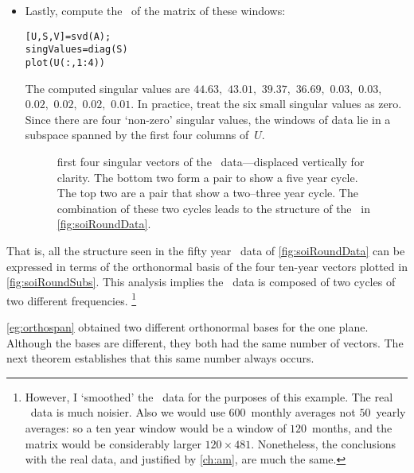 \begin{example}
\begin{itemize}
\item Lastly, compute the \svd\ of the matrix of these windows:
\begin{verbatim}
[U,S,V]=svd(A);
singValues=diag(S)
plot(U(:,1:4))
\end{verbatim}
\setbox\ajrqrbox\hbox{}%
\marginpar{\usebox{\ajrqrbox}}%
The computed singular values are $44.63,$ $43.01,$ $39.37,$ $36.69,$ $0.03,$ $0.03,$ $0.02,$ $0.02,$ $0.02,$ $0.01$.
In practice, treat the six small singular values as zero.
Since there are four `non-zero' singular values, the windows of data lie in a subspace spanned by the first four columns of~\(U\).
\begin{figure}
\centering

\caption{first four singular vectors of the \soi\ data---displaced vertically for clarity.  
The bottom two form a pair to show a five year cycle.  
The top two are a pair that show a two--three year cycle.  
The combination of these two cycles leads to the structure of the \soi\ in \autoref{fig:soiRoundData}.}
\label{fig:soiRoundSubs}
\end{figure}%
\end{itemize}
That is, all the structure seen in the fifty year \soi\ data of \autoref{fig:soiRoundData} can be expressed in terms of the  orthonormal basis of the four ten-year vectors plotted in \autoref{fig:soiRoundSubs}.
This analysis implies the \soi\ data is composed of two cycles of two different frequencies.
\footnote{However, I `smoothed' the \soi\ data for the purposes of this example.  The real \soi\ data is much noisier.  
Also we would use \(600\)~monthly averages not \(50\)~yearly averages: so a ten year window would be a window of \(120\)~months, and the matrix would be considerably larger \(120\times481\).  
Nonetheless, the conclusions with the real data, and justified by \autoref{ch:am}, are much the same.}
\end{example}



\autoref{eg:orthospan} obtained two different orthonormal bases for the one plane.  
Although the bases are different, they both had the same number of vectors.
The next theorem establishes that this same number always occurs.

